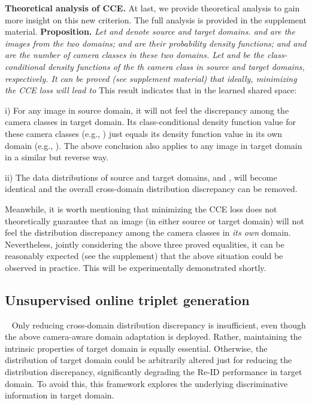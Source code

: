 \documentclass[10pt,twocolumn,letterpaper]{article}
\begin{document}
\textbf{Theoretical analysis of CCE.} At last, we provide theoretical analysis to gain more insight on this new criterion. The full analysis is provided in the supplement material. 
\textbf{Proposition.} \textit{Let  and  denote source and target domains.  and  are the images from the two domains;  and  are their probability density functions; and  and  are the number of camera classes in these two domains. Let  and  be the class-conditional density functions of the th camera class in source and target domains, respectively. It can be proved (see supplement material) that ideally, minimizing the CCE loss will lead to}
This result indicates that in the learned shared space: 
 
i) For any image in source domain, it will not feel the discrepancy among the  camera classes in target domain. Its class-conditional density function value for these camera classes (e.g., ) just equals its density function value in its own domain (e.g., ). The above conclusion also applies to any image in target domain in a similar but reverse way. 
 


ii) The data distributions of source and target domains,  and , will become identical and the overall cross-domain distribution discrepancy can be removed. 
 
Meanwhile, it is worth mentioning that minimizing the CCE loss does not theoretically guarantee that an image (in either source or target domain) will not feel the distribution discrepancy among the camera classes in \textit{its own} domain. Nevertheless, jointly considering the above three proved equalities, it can be reasonably expected (see the supplement) that the above situation could be observed in practice. This will be experimentally demonstrated shortly.  
 


 
\subsection{Unsupervised online triplet generation}~\label{sec:UOT}
Only reducing cross-domain distribution discrepancy is insufficient, even though the above camera-aware domain adaptation is deployed. Rather, maintaining the intrinsic properties of target domain is equally essential. Otherwise, the distribution of target domain could be arbitrarily altered just for reducing the distribution discrepancy, significantly degrading the Re-ID performance in target domain. To avoid this, this framework explores the underlying discriminative information in target domain. 
\end{document}
